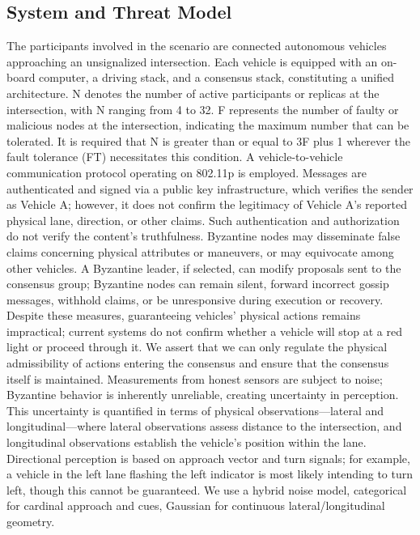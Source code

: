 \documentclass[letterpaper,10pt,conference]{IEEEtran}
\begin{document}
\subsection{System and Threat Model}
\label{sec:model}

The participants involved in the scenario are connected autonomous vehicles approaching an unsignalized intersection. Each vehicle is equipped with an on-board computer, a driving stack, and a consensus stack, constituting a unified architecture. N denotes the number of active participants or replicas at the intersection, with N ranging from 4 to 32. F represents the number of faulty or malicious nodes at the intersection, indicating the maximum number that can be tolerated. It is required that N is greater than or equal to 3F plus 1 wherever the fault tolerance (FT) necessitates this condition. A vehicle-to-vehicle communication protocol operating on 802.11p is employed. Messages are authenticated and signed via a public key infrastructure, which verifies the sender as Vehicle A; however, it does not confirm the legitimacy of Vehicle A's reported physical lane, direction, or other claims. Such authentication and authorization do not verify the content’s truthfulness. Byzantine nodes may disseminate false claims concerning physical attributes or maneuvers, or may equivocate among other vehicles. A Byzantine leader, if selected, can modify proposals sent to the consensus group; Byzantine nodes can remain silent, forward incorrect gossip messages, withhold claims, or be unresponsive during execution or recovery. Despite these measures, guaranteeing vehicles' physical actions remains impractical; current systems do not confirm whether a vehicle will stop at a red light or proceed through it. We assert that we can only regulate the physical admissibility of actions entering the consensus and ensure that the consensus itself is maintained. Measurements from honest sensors are subject to noise; Byzantine behavior is inherently unreliable, creating uncertainty in perception. This uncertainty is quantified in terms of physical observations—lateral and longitudinal—where lateral observations assess distance to the intersection, and longitudinal observations establish the vehicle's position within the lane. Directional perception is based on approach vector and turn signals; for example, a vehicle in the left lane flashing the left indicator is most likely intending to turn left, though this cannot be guaranteed. We use a hybrid noise model, categorical for cardinal approach and cues, Gaussian for continuous lateral/longitudinal geometry. 
\end{document}

